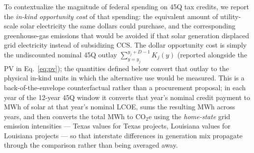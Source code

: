 \documentclass[11pt]{article}
\newcommand{\cotwoe}{\ensuremath{\mathrm{CO_{2}e}}}
\begin{document}
To contextualize the magnitude of federal spending on 45Q tax credits, we report the \emph{in-kind opportunity cost} of that spending: the equivalent amount of utility-scale solar electricity the same dollars could purchase, and the corresponding greenhouse-gas emissions that would be avoided if that solar generation displaced grid electricity instead of subsidizing CCS. The dollar opportunity cost is simply the undiscounted nominal 45Q outlay $\sum_{y=y_j}^{y_j+D-1} K_j(y)$ (reported alongside the PV in Eq.~\ref{eq:pv}); the quantities defined below convert that outlay to the physical in-kind units in which the alternative use would be measured. This is a back-of-the-envelope counterfactual rather than a procurement proposal; in each year of the 12-year 45Q window it converts that year's nominal credit payment to MWh of solar at that year's nominal LCOE, sums the resulting MWh across years, and then converts the total MWh to \cotwoe{} using the \emph{home-state} grid emission intensities --- Texas values for Texas projects, Louisiana values for Louisiana projects --- so that interstate differences in generation mix propagate through the comparison rather than being averaged away.
\end{document}
